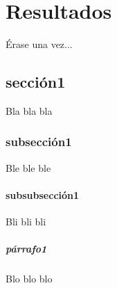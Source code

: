 	\chapter{Resultados}\label{cap.resultados}
	
	Érase una vez...
	\section{sección1}
	Bla bla bla
	\subsection{subsección1}
	Ble ble ble
	\subsubsection{subsubsección1}
	Bli bli bli
	\paragraph{párrafo1}
	Blo blo blo



	\newpage
	$\ $